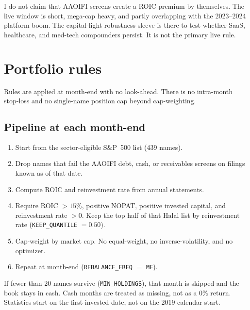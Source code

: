 \documentclass[11pt,letterpaper]{article}
\begin{document}
I do not claim that AAOIFI screens create a ROIC premium by themselves. The live window is short, mega-cap heavy, and partly overlapping with the 2023--2024 platform boom. The capital-light robustness sleeve is there to test whether SaaS, healthcare, and med-tech compounders persist. It is not the primary live rule.

\section{Portfolio rules}
\label{sec:rules}

Rules are applied at month-end with no look-ahead. There is no intra-month stop-loss and no single-name position cap beyond cap-weighting.

\subsection{Pipeline at each month-end}

\begin{enumerate}
  \item Start from the sector-eligible S\&P~500 list (439 names).
  \item Drop names that fail the AAOIFI debt, cash, or receivables screens on filings known as of that date.
  \item Compute ROIC and reinvestment rate from annual statements.
  \item Require ROIC $> 15\%$, positive NOPAT, positive invested capital, and reinvestment rate $> 0$. Keep the top half of that Halal list by reinvestment rate (\texttt{KEEP\_QUANTILE} $= 0.50$).
  \item Cap-weight by market cap. No equal-weight, no inverse-volatility, and no optimizer.
  \item Repeat at month-end (\texttt{REBALANCE\_FREQ} $=$ \texttt{ME}).
\end{enumerate}

If fewer than 20 names survive (\texttt{MIN\_HOLDINGS}), that month is skipped and the book stays in cash. Cash months are treated as missing, not as a 0\% return. Statistics start on the first invested date, not on the 2019 calendar start.
\end{document}

